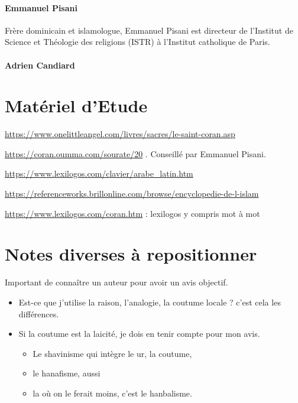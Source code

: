\paragraph{Emmanuel Pisani}
Frère dominicain et islamologue, Emmanuel Pisani est directeur de l’Institut de Science et Théologie des religions (ISTR) à l’Institut catholique de Paris.

\paragraph{Adrien Candiard}



\section{Matériel d'Etude}\label{matuxe9riel}

\url{https://www.onelittleangel.com/livres/sacres/le-saint-coran.asp}

\url{https://coran.oumma.com/sourate/20} . Conseillé par Emmanuel
Pisani.

\url{https://www.lexilogos.com/clavier/arabe_latin.htm}

\url{https://referenceworks.brillonline.com/browse/encyclopedie-de-l-islam}

\url{https://www.lexilogos.com/coran.htm} : lexilogos y compris mot à
mot




\section{Notes diverses à repositionner}







Important de connaître un auteur pour avoir un avis objectif.





\begin{itemize}

  
\item  Est-ce que j'utilise la raison, l'analogie, la coutume locale ? c'est
  cela les différences.
\item  Si la coutume est la laicité, je dois en tenir compte pour mon avis.

  \begin{itemize}
  \item    Le shavinisme qui intègre le ur, la coutume,
  \item     le hanafisme, aussi~
  \item    la où on le ferait moins, c'est le hanbalisme.
  \end{itemize}
\end{itemize}



